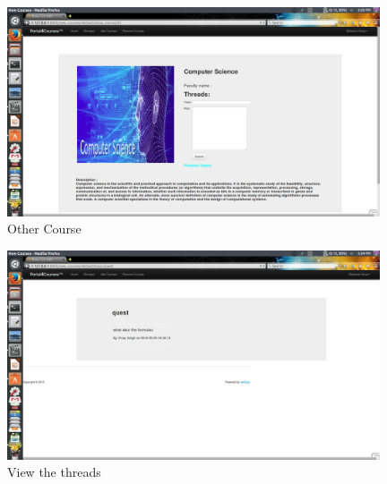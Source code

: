 \documentclass{article}
\begin{document}
\begin{figure}[ht!]
\centering
\includegraphics[width=110mm]{course1.png}
\caption{ Other Course}
\end{figure}
\begin{figure}[ht!]
\centering
\includegraphics[width=110mm]{thread_post.png}
\caption{View the threads}
\end{figure}
\newpage
\end{document}
